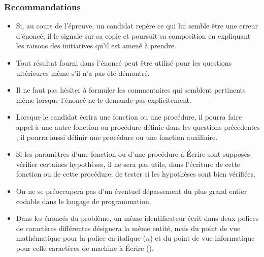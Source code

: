 \subsubsection*{Recommandations}
\begin{itemize}
\item Si, au cours de l'épreuve, un candidat repère ce qui lui semble être une erreur d'énoncé, il le signale sur sa copie et poursuit sa composition en expliquant les raisons des initiatives qu'il est amené à prendre.
\item Tout résultat fourni dans l'énoncé peut être utilisé pour les questions ultérieures même s'il n'a pas été démontré.
\item Il ne faut pas hésiter à formuler les commentaires qui semblent pertinents même lorsque l'énoncé ne le demande pas explicitement.
\item Lorsque le candidat écrira une fonction ou une procédure, il pourra faire appel à une autre fonction ou procédure définie dans les questions précédentes ; il pourra aussi définir une procédure ou une fonction auxiliaire.
\item Si les paramètres d'une fonction ou d'une procédure à Écrire sont supposés vérifier certaines hypothèses, il ne sera pas utile, dans l'écriture de cette fonction ou de cette procédure, de tester si les hypothèses sont bien vérifiées.  
\item On ne se préoccupera pas d'un éventuel dépassement du plus grand entier codable dans le langage de programmation.
\item Dans les énoncés du problème, un même identificateur écrit dans deux polices de caractères différentes désignera la même entité, mais du point de vue mathématique pour la police en italique ($n$) et du point de vue informatique pour celle caractères de machine à Écrire ().
\end{itemize}
